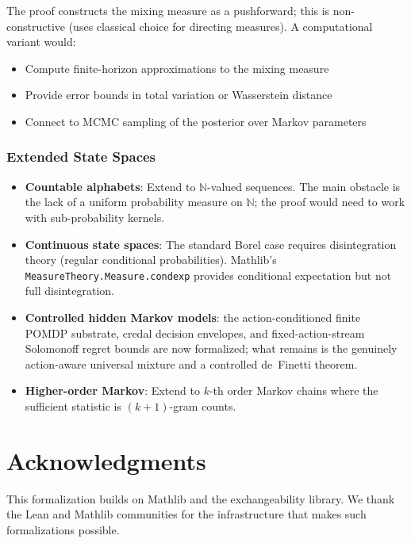 \documentclass[11pt,a4paper]{article}
\theoremstyle{definition}
\begin{document}
The proof constructs the mixing measure as a pushforward; this is
non-constructive (uses classical choice for directing measures).
A computational variant would:
\begin{itemize}
\item Compute finite-horizon approximations to the mixing measure
\item Provide error bounds in total variation or Wasserstein distance
\item Connect to MCMC sampling of the posterior over Markov parameters
\end{itemize}

\subsubsection{Extended State Spaces}

\begin{itemize}
\item \textbf{Countable alphabets}: Extend to $\mathbb{N}$-valued sequences.
  The main obstacle is the lack of a uniform probability measure on $\mathbb{N}$;
  the proof would need to work with sub-probability kernels.
\item \textbf{Continuous state spaces}: The standard Borel case requires
  disintegration theory (regular conditional probabilities). Mathlib's
  \texttt{MeasureTheory.Measure.condexp} provides conditional expectation
  but not full disintegration.
\item \textbf{Controlled hidden Markov models}: the action-conditioned finite
  POMDP substrate, credal decision envelopes, and fixed-action-stream
  Solomonoff regret bounds are now formalized; what remains is the genuinely
  action-aware universal mixture and a controlled de~Finetti theorem.
\item \textbf{Higher-order Markov}: Extend to $k$-th order Markov chains
  where the sufficient statistic is $(k+1)$-gram counts.
\end{itemize}

\section*{Acknowledgments}

This formalization builds on Mathlib and the exchangeability library.
We thank the Lean and Mathlib communities for the infrastructure that
makes such formalizations possible.
\end{document}
